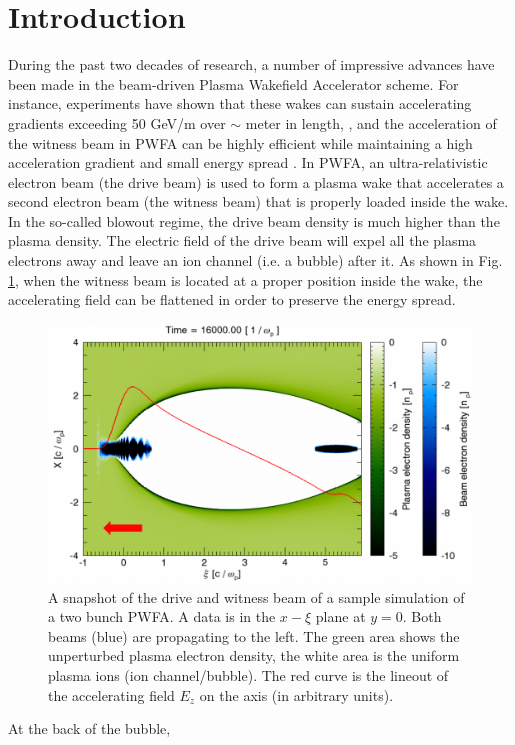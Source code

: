 \documentclass[%
reprint, superscriptaddress,
 amsmath,amssymb, aps,
prstab,
]{revtex4-2}
\begin{document}
\section{Introduction} During the past two decades of research, a number of impressive advances have been made in the beam-driven Plasma Wakefield Accelerator scheme. For instance, experiments have shown that these wakes can
sustain accelerating gradients exceeding 50 GeV/m over $\sim$ meter in length,
 \cite{PWFA2007}, and the acceleration of the witness beam in PWFA
can be highly efficient while maintaining a high acceleration gradient
and small energy spread \cite{PWFA2014}. In PWFA, an ultra-relativistic
electron beam (the drive beam) is used to form a plasma wake 
that accelerates a second electron beam (the witness beam) that is properly loaded inside
the wake. In the so-called blowout regime, the drive beam density is
much higher than the plasma density. The electric field of the drive
beam will expel all the plasma electrons away and leave an
ion channel (i.e. a bubble) after it. As shown in Fig.
\ref{fig:TwoBunches}, when the witness beam is located at a proper
position inside the wake, the accelerating field can be flattened in
order to preserve the energy spread. \begin{figure}[htbp] \centering
\includegraphics[width=0.9\linewidth]{TwoBunches2.png} \caption{A
snapshot of the drive and witness beam of a sample simulation of a two bunch PWFA. A data is in the $x-\xi$ plane at $y=0$.  Both beams (blue) are
propagating to the left. The green area shows the unperturbed plasma electron
density, the white area is the uniform plasma ions (ion channel/bubble).
The red curve is the lineout of the accelerating field $E_z$ on the
axis (in arbitrary units).} \label{fig:TwoBunches} \end{figure} At the back of the bubble,
\end{document}
